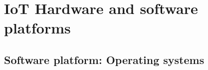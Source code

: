 \section{IoT Hardware and software platforms}

\subsection{Software platform: Operating systems}




